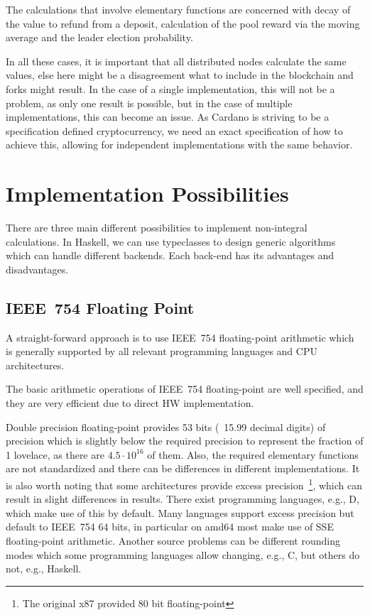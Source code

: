 \documentclass[11pt,a4paper,dvipsnames]{article}
\theoremstyle{definition}
\theoremstyle{definition}
\begin{document}
The calculations that involve elementary functions are concerned with decay of
the value to refund from a deposit, calculation of the pool reward via the
moving average and the leader election probability.

In all these cases, it is important that all distributed nodes calculate the
same values, else here might be a disagreement what to include in the blockchain
and forks might result. In the case of a single implementation, this will not be
a problem, as only one result is possible, but in the case of multiple
implementations, this can become an issue. As Cardano is striving to be a
specification defined cryptocurrency, we need an exact specification of how to
achieve this, allowing for independent implementations with the same behavior.

\section{Implementation Possibilities}
\label{sec:impl-poss}

There are three main different possibilities to implement non-integral
calculations. In Haskell, we can use typeclasses to design generic algorithms
which can handle different backends. Each back-end has its advantages and
disadvantages.

\subsection{IEEE~754 Floating Point}
\label{sec:ieee-754-floating}

A straight-forward approach is to use IEEE~754 floating-point arithmetic which
is generally supported by all relevant programming languages and CPU
architectures.

The basic arithmetic operations of IEEE~754 floating-point are well specified,
and they are very efficient due to direct HW implementation.

Double precision floating-point provides 53 bits (~15.99 decimal digits) of
precision which is slightly below the required precision to represent the
fraction of 1 lovelace, as there are $4.5\cdot10^{16}$ of them. Also, the
required elementary functions are not standardized and there can be differences
in different implementations. It is also worth noting that some architectures
provide excess precision~\footnote{The original x87 provided 80 bit
  floating-point}, which can result in slight differences in results. There
exist programming languages, e.g., D, which make use of this by default. Many
languages support excess precision but default to IEEE~754 64 bits, in
particular on amd64 most make use of SSE floating-point arithmetic. Another
source problems can be different rounding modes which some programming languages
allow changing, e.g., C, but others do not, e.g., Haskell.
\end{document}
